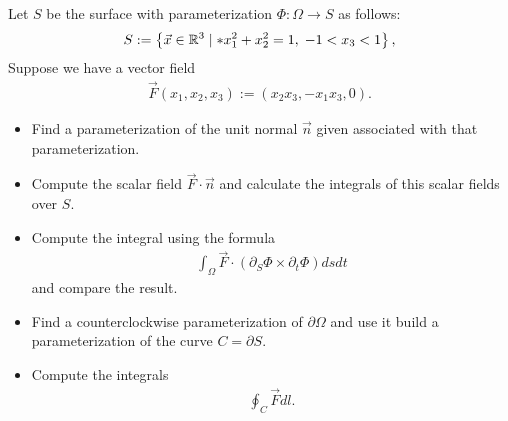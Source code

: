 \documentclass[11pt]{article}
\begin{document}
\begin{exercise} %
    Let $S$ be the surface with parameterization $\Phi : \Omega \to S$ as follows:
    \begin{align}
     S := \left\{ \vec x \in \bbR^3 \suchthat* x_1^2 + x_2^2 = 1, \; -1 < x_3 < 1 \right\},
    \end{align}
    Suppose we have a vector field 
    \begin{align}
        \vec F(x_1,x_2,x_3) := (x_2 x_3, -x_1 x_3, 0 ).
    \end{align}
    \begin{itemize}
    \item
     Find a parameterization of the unit normal $\vec n$ given associated with that parameterization.
    \item
     Compute the scalar field $\vec F \cdot \vec n$ and calculate the integrals of this scalar fields over $S$.
    \item
     Compute the integral using the formula 
     \begin{align}
        \int_\Omega \vec F \cdot ( \partial_S \Phi \times \partial_t \Phi ) dsdt
     \end{align}
     and compare the result. 
    \item 
     Find a counterclockwise parameterization of $\partial\Omega$ and use it build a parameterization of the curve $C = \partial S$.
    \item 
     Compute the integrals 
     \begin{align}
        \oint_C \vec F dl.
     \end{align}

    \end{itemize}
\end{exercise}
\end{document}
